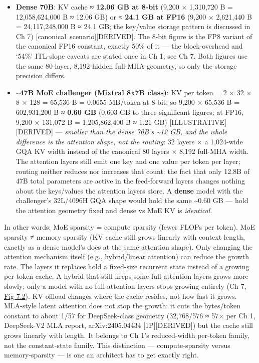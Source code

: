 \begin{itemize}
\tightlist
\item
  \textbf{Dense 70B}: KV cache ≈ \textbf{12.06 GB at 8-bit} (9,200 ×
  1,310,720 B = 12,058,624,000 B ≈ 12.06 GB) or ≈ \textbf{24.1 GB at
  FP16} (9,200 × 2,621,440 B = 24,117,248,000 B ≈ 24.1 GB; the key/value
  storage pattern is discussed in Ch 7) \mbox{{[}canonical
  scenario{]}}\hspace{0pt}\mbox{{[}DERIVED{]}}. The 8-bit figure is the FP8 variant of the
  canonical FP16 constant, exactly 50\% of it --- the block-overhead and
  `54\%' ITL-slope caveats are stated once in Ch 1; see Ch 7. Both
  figures use the same 80-layer, 8,192-hidden full-MHA geometry, so only
  the storage precision differs.
\item
  \textbf{\textasciitilde47B MoE challenger (Mixtral 8x7B class)}: KV
  per token = 2 × 32 × 8 × 128 = 65,536 B = 0.0655 MB/token at 8-bit, so
  9,200 × 65,536 B = 602,931,200 B ≈ \textbf{0.60 GB} (0.603 GB to three
  significant figures; at FP16, 9,200 × 131,072 B = 1,205,862,400 B ≈
  1.21 GB) \mbox{{[}ILLUSTRATIVE{]}}\hspace{0pt}\mbox{{[}DERIVED{]}} --- \emph{smaller than the
  dense 70B's \textasciitilde12 GB, and the whole difference is the
  attention shape, not the routing}: 32 layers × a 1,024-wide GQA KV
  width instead of the canonical 80 layers × 8,192 full-MHA width. The
  attention layers still emit one key and one value per token per layer;
  routing neither reduces nor increases that count: the fact that only
  12.8B of 47B total parameters are active in the feed-forward layers
  changes nothing about the keys/values the attention layers store. A
  \textbf{dense} model with the challenger's 32L/4096H GQA shape would
  hold the same \textasciitilde0.60 GB --- hold the attention geometry
  fixed and dense vs MoE KV is \emph{identical}.
\end{itemize}

In other words: MoE sparsity = compute sparsity (fewer FLOPs per token).
MoE sparsity ≠ memory sparsity (KV cache still grows linearly with
context length, exactly as a dense model's does at the same attention
shape). Only changing the attention mechanism itself (e.g.,
hybrid/linear attention) can reduce the growth rate. The layers it
replaces hold a fixed-size recurrent state instead of a growing
per-token cache. A hybrid that still keeps some full-attention layers
grows more slowly; only a model with no full-attention layers stops
growing entirely (Ch 7, \hyperref[fig:7.2]{Fig 7.2}). KV offload changes where the cache
resides, not how fast it grows. MLA-style latent attention does not stop
the growth: it cuts the bytes/token constant to about 1/57 for
DeepSeek-class geometry (32,768/576 ≈ 57× per Ch 1, DeepSeek-V2 MLA
report, arXiv:2405.04434 \mbox{{[}1P{]}}\hspace{0pt}\mbox{{[}DERIVED{]}}) but the cache still
grows linearly with length. It belongs to Ch 1's reduced-width per-token
family, not the constant-state family. This distinction ---
compute-sparsity versus memory-sparsity --- is one an architect has to
get exactly right.

